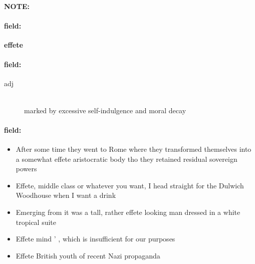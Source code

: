 \documentclass[12pt]{article}
\newenvironment{note}{\paragraph{NOTE:}}{}
\newenvironment{field}{\paragraph{field:}}{}
\begin{document}
\begin{note}
\begin{field}
\textbf{\large effete}
\end{field}


\begin{field}
\begin{description}
\item[adj] \hfill \\ 
marked by excessive self-indulgence and moral decay

\end{description}
\end{field}

\begin{field}
\begin{itemize}
\item After some time they went to Rome where they transformed themselves into a somewhat effete aristocratic body tho they retained residual sovereign powers
\item Effete, middle class or whatever you want, I head straight for the Dulwich Woodhouse when I want a drink
\item Emerging from it was a tall, rather effete looking man dressed in a white tropical suite
\item Effete mind ' , which is insufficient for our purposes
\item Effete British youth of recent Nazi propaganda
\end{itemize}
\end{field}
\end{note}
\end{document}
